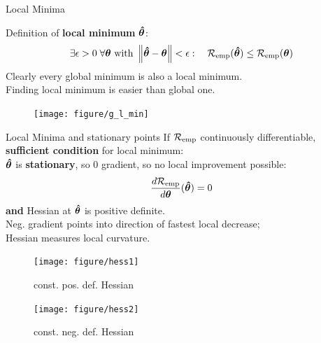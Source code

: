 \documentclass[11pt,compress,t,notes=noshow, xcolor=table]{beamer}
\begin{document}
\begin{vbframe}{Local Minima}

Definition of \textbf{local minimum} $\bm{\hat\theta}$:
\[
\exists \epsilon > 0\; \forall \bm{\theta} \text{ with } \left\Vert\bm{\hat\theta} - \bm{\theta}\right\Vert < \epsilon: \quad \mathcal{R}_{\text{emp}}(\bm{\hat\theta}) \leq \mathcal{R}_{\text{emp}}(\bm{\theta}) 
\]
Clearly every global minimum is also a local minimum.\\

Finding local minimum is easier than global one.

\vfill

\begin{center}
\begin{figure}[!b]
\texttt{[image: figure/g\_l\_min]}
\end{figure}
\end{center}

\end{vbframe}
\begin{vbframe}{Local Minima and stationary points}
\footnotesize
If $\mathcal{R}_{\text{emp}}$ continuously differentiable, \textbf{sufficient condition} for local minimum: \\
$\bm{\hat\theta}$ is \textbf{stationary}, so 0 gradient, so no local improvement possible:
\[
\frac{d \mathcal{R}_{\text{emp}}}{d\bm{\theta}}(\bm{\hat\theta}) = 0
\]
\textbf{and} Hessian at $\bm{\hat\theta}$ is positive definite. \\

Neg. gradient points into direction of fastest local decrease;\\
Hessian measures local curvature.

\begin{figure}[!htb]
{
  \texttt{[image: figure/hess1]}
  \caption*{\footnotesize const. pos. def. Hessian}
}
{
  \texttt{[image: figure/hess2]}
  \caption*{\footnotesize const. neg. def. Hessian}
}
\end{figure}

\end{vbframe}

\end{document}
